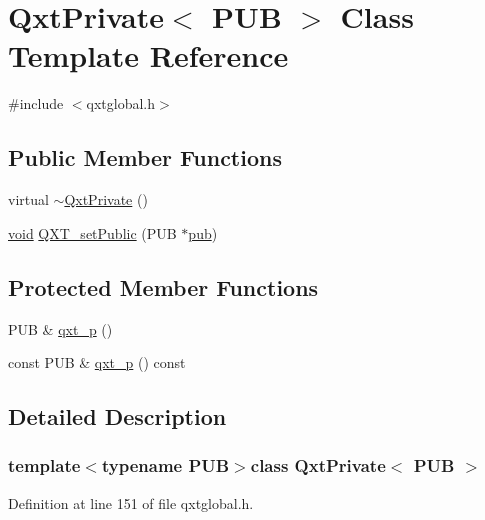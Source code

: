 \hypertarget{class_qxt_private}{\section{Qxt\-Private$<$ P\-U\-B $>$ Class Template Reference}
\label{class_qxt_private}
}


{\ttfamily \#include $<$qxtglobal.\-h$>$}

\subsection*{Public Member Functions}
\begin{DoxyCompactItemize}
\item 
virtual \hyperlink{class_qxt_private_a52c65876fecf578bcafed6a34ef5302f}{$\sim$\-Qxt\-Private} ()
\item 
\hyperlink{group___u_a_v_objects_plugin_ga444cf2ff3f0ecbe028adce838d373f5c}{void} \hyperlink{class_qxt_private_a4ce78973fe45d42d57536f4ee068dc79}{Q\-X\-T\-\_\-set\-Public} (P\-U\-B $\ast$\hyperlink{qxtdiscoverableservice_8cpp_a6562f7cbc155fc4ed8d142210e12717b}{pub})
\end{DoxyCompactItemize}
\subsection*{Protected Member Functions}
\begin{DoxyCompactItemize}
\item 
P\-U\-B \& \hyperlink{class_qxt_private_a8a154f41226663dc0e9ddf1692f71be0}{qxt\-\_\-p} ()
\item 
const P\-U\-B \& \hyperlink{class_qxt_private_a60448fc4c04731ad159b6eae72b9ce02}{qxt\-\_\-p} () const 
\end{DoxyCompactItemize}


\subsection{Detailed Description}
\subsubsection*{template$<$typename P\-U\-B$>$class Qxt\-Private$<$ P\-U\-B $>$}



Definition at line 151 of file qxtglobal.\-h.



